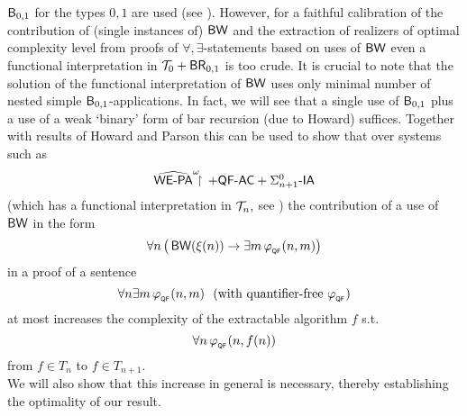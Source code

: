 $\textsf{\upshape B}_{0,1}$ for the 
types $0,1$ are used (see \cite{Kohlenbach99}). 
However, for a faithful calibration of the contribution of 
(single instances of) 
$\textsf{\upshape BW}$ and the extraction 
of realizers of optimal complexity level from proofs of 
$\forall,\exists$-statements based on uses of $\textsf{\upshape BW}$ even
a functional interpretation in $\mathcal{T}_0+\textsf{\upshape BR}_{0,1}$ is too crude. 
It is crucial to note that 
the solution of the functional interpretation of $\textsf{\upshape BW}$ uses only minimal 
number 
of nested simple $\textsf{\upshape B}_{0,1}$-applications. In fact, we will see that a single use 
of $\textsf{\upshape B}_{0,1}$ plus a use of a weak `binary' form of bar recursion (due 
to Howard) suffices. Together with results of Howard and Parson 
this can be used to show that over systems such as 
\[ \mbox{$\widehat{\textsf{\upshape WE-PA}}^\omega\!\!\!\restriction\,+\textsf{\upshape QF-}\textsf{\upshape AC}+\Sigma^0_{n+1}$-$\textsf{\upshape IA}$} \] (which has 
a functional interpretation in $\mathcal{T}_n,$ see \cite{Parsons72}) 
the contribution of a use of $\textsf{\upshape BW}$ in the form 
\[ \forall n\, \big(\,\mbox{$\textsf{\upshape BW}$}(\xi(n))\to\exists m\,
\varphi_{_{\textsf{\upshape QF}}}(n,m)\big)\] 
in a proof of a sentence 
\[ \forall n\exists m\,\phi_{_\QF}(n,m) \ \   \mbox{(with quantifier-free 
$\phi_{_\QF}$)} \] 
at most increases the complexity of the 
extractable algorithm $f$ s.t. 
\[ \forall n\, \varphi_{_{\textsf{\upshape QF}}}(n,f(n)) \] 
from $f\in T_n$ to $f\in T_{n+1}.$\\
We will also show that this increase 
in general is necessary, thereby establishing the 
optimality of our result.   
\\[1mm] 
